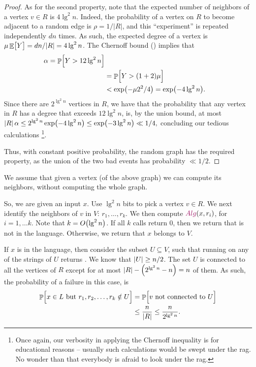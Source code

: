 \begin{proof}
    As for the second property, note that the expected number of
    neighbors of a vertex $v \in R$ is $4 \lg^2 n$.  Indeed, the
    probability of a vertex on $R$ to become adjacent to a random edge
    is $\rho = 1 / |R|$, and this ``experiment'' is repeated
    independently $d n$ times. As such, the expected degree of a
    vertex is $\mu \mathop{\mathbb{E}}\!\left[ {\bigl. Y} \right] = dn/|R| = 4 \lg^2 n$. The Chernoff bound
    () implies that
    \begin{align*}
        \alpha%
        = %
        \Prob{\Bigl. Y > 12 \lg^2 n }%
        \\&= %
        \Prob{\Bigl. Y > (1 + 2) \mu }%
        \\&<%
        \exp\pth{ - \mu 2^2 / 4 }%
        =%
        \exp\pth{ -4 \lg^2 n}.
    \end{align*}
    Since there are $ 2^{\lg^2 n}$ vertices in $R$, we have that the
    probability that any vertex in $R$ has a degree that exceeds $12
    \lg^2 n$, is, by the union bound, at most
    \begin{math}
        \ds \cardin{R} \alpha \leq 2^{\lg^2 n} \exp\pth{ -4 \lg^2 n}
        \leq \exp\pth{ -3 \lg^2 n} \ll 1/4,
    \end{math}
    concluding our tedious calculations%
    \footnote{Once again, our verbosity in applying the Chernoff
       inequality is for educational reasons -- usually such
       calculations would be swept under the rag. No wonder than that
       everybody is afraid to look under the rag.}.
    
    Thus, with constant positive probability, the random graph has the
    required property, as the union of the two bad events has
    probability $\ll 1/2$.
\end{proof}





We assume that given a vertex (of the above graph) we can compute its
neighbors, without computing the whole graph.

So, we are given an input $x$.  Use $\lg^2{n}$ bits to pick a vertex
$v \in R$. We next identify the neighbors of $v$ in $V$: $r_1, \ldots,
r_k$. We then compute $\Alg\pth{ x, r_i}$, for $i=1,\ldots k$. Note
that $k = O\pth{\lg^2 n }$. If all $k$ calls return $0$, then we
return that \Alg is not in the language. Otherwise, we return that $x$
belongs to $V$.

If $x$ is in the language, then consider the subset $U\subseteq V$,
such that running \Alg on any of the strings of $U$ returns \TRUE. We
know that $\left| {U} \right| \geq n/2$. The set $U$ is connected to all the
vertices of $R$ except for at most $\cardin{R} - \pth{2^{\lg^2 n} -n}
= n$ of them. As such, the probability of a failure in this case, is
\begin{align*}
    \Prob{\Bigl. x \in L \text{ but } r_1, r_2, \ldots, r_k \notin U
    }%
    &=%
    \Prob{\Bigl. v \text{ not connected to } U } \\
    &\leq
    \frac{n}{\cardin{R}}%
    \leq%
    \frac{n}{2^{\lg^2 n }}.
\end{align*}

